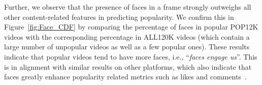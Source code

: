 Further, we observe that the presence of faces in a frame strongly outweighs all other content-related features in predicting popularity. %
We confirm this in Figure~\ref{fig:Face_CDF} by comparing the percentage of faces in popular POP12K videos with the corresponding percentage in ALL120K videos (which contain a large number of unpopular videos as well as a few popular ones).  These results indicate that popular videos tend to have more faces, i.e., ``\emph{faces engage us}''. This is in alignment with similar results on other platforms, which also indicate that faces greatly enhance popularity related metrics such as likes and comments~\cite{bakhshi2014faces}. 




